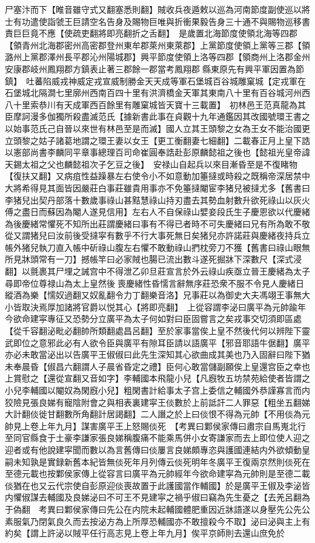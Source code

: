 尸塞汴而下【睢音雖守式又翻塞悉則翻】賊收兵夜遁敕以巡為河南節度副使巡以將士有功遣使詣虢王巨請空名告身及賜物巨唯與折衝果毅告身三十通不與賜物巡移書責巨巨竟不應【使疏吏翻將即亮翻折之舌翻】　是歲置北海節度使領北海等四郡【領青州北海郡密州高密郡登州東牟郡萊州東萊郡】上黨節度使領上黨等三郡【領潞州上黨郡澤州長平郡沁州陽城郡】興平節度使領上洛等四郡【領商州上洛郡金州安康郡岐州鳳翔郡方鎮表止著三郡餘一郡當考鳳翔郡縣東原先有興平軍因置為節鎮】　吐蕃陷威戎神威定戎宣威制勝金天天成等軍石堡城百谷城雕窠城【定戎軍在石堡城北隔澗七里廓州西南百四十里有洪濟橋金天軍其東南八十里有百谷城河州西八十里索恭川有天成軍西百餘里有雕窠城皆天寶十三載置】　初林邑王范真龍為其臣摩訶漫多伽獨所殺盡滅范氏【據新書此事在貞觀十九年通鑑因其改國號環王書之以始事范氏己自晉以來世有林邑至是而滅】國人立其王頭黎之女為王女不能治國更立頭黎之姑子諸葛地謂之環王妻以女王【更工衡翻妻七細翻】二載春正月上皇下誥以憲部尚書李麟同平章事總理百司命崔圓奉誥赴彭原麟懿祖之後也【懿祖光皇帝諱天錫太祖之父也麟懿祖次子乞豆之後】　安禄山自起兵以來目漸昏至是不復睹物【復扶又翻】又病疽性益躁暴左右使令小不如意動加箠撻或時殺之既稱帝深居禁中大將希得見其面皆因嚴莊白事莊雖貴用事亦不免箠撻閹宦李猪兒被撻尤多【舊書曰李猪兒出契丹部落十數歲事祿山甚黠慧祿山持刃盡去其勢血射數升欲死祿山以灰火傅之盡日而蘇因為閹人遂見信用】左右人不自保祿山嬖妾段氏生子慶恩欲以代慶緒為後慶緒常懼死不知所出莊謂慶緒曰事有不得已者時不可失慶緒曰兄有所為敢不敬從又謂猪兒曰汝前後受撻寜有數乎不行大事死無日矣猪兒亦許諾莊與慶緒夜持兵立帳外猪兒執刀直入帳中斫祿山腹左右懼不敢動祿山捫枕旁刀不獲【舊書曰祿山眼無所見牀頭常有一刀】撼帳竿曰必家賊也腸已流出數斗遂死掘牀下深數尺【深式浸翻】以氈裹其尸埋之誡宫中不得泄乙卯旦莊宣言於外云祿山疾亟立晉王慶緒為太子尋即帝位尊禄山為太上皇然後喪慶緒性昏懦言辭無序莊恐衆不服不令見人慶緒日縱酒為樂【懦奴過翻又奴亂翻令力丁翻樂音洛】兄事莊以為御史大夫馮翊王事無大小皆取決焉厚加諸將官爵以悦其心【將即亮翻】　上從容謂李泌曰廣平為元帥踰年今欲命建寜專征又恐勢分立廣平為太子何如對曰臣固嘗言之矣戎事交切須即區處【從千容翻泌毗必翻帥所類翻處昌呂翻】至於家事當俟上皇不然後代何以辨陛下靈武即位之意邪此必有人欲令臣與廣平有隙耳臣請以語廣平【邪音耶語牛倨翻】廣平亦必未敢當泌出以告廣平王俶俶曰此先生深知其心欲曲成其美也乃入固辭曰陛下猶未奉晨昏【俶昌六翻謂人子晨省昏定之禮】臣何心敢當儲副願俟上皇還宫臣之幸也上賞慰之【還從宣翻又音如字】李輔國本飛龍小兒【凡廐牧五坊禁苑給使者皆謂之小兒李輔國以閹奴為閑廐小兒】粗閑書計給事太子宫上委信之輔國外恭謹寡言而内狡險見張良娣有寵陰附會之與相表裏建寜王倓數於上前詆訐二人罪惡【粗坐五翻娣大計翻倓徙甘翻數所角翻計居謁翻】二人譖之於上曰倓恨不得為元帥【不用倓為元帥見上卷上年九月】謀害廣平王上怒賜倓死　【考異曰鄴侯家傳曰肅宗自馬嵬北行至同官縣食于土豪李謙家張良娣稱腹痛不能乘馬併小女寄謙家而去上即位使人迎之迎者或有他說建寜聞而數以為言舊傳曰倓屢言良娣頗專恣與護國連結内外欲傾動皇嗣未知孰是實録新舊本紀皆無倓死年月列傳云倓死明年冬廣平王復兩京然則倓死在至德元載也按鄴侯家傳上從容言曰廣平為元帥經年今欲命建寜為元帥則是至德二載倓猶在也又云代宗使自彭原迎倓喪故置于此護國當作輔國】於是廣平王俶及李泌皆内懼俶謀去輔國及良娣泌曰不可王不見建寜之禍乎俶曰竊為先生憂之【去羌呂翻為于偽翻　考異曰鄴侯家傳曰先公在内院未起輔國體肥重因近牀語遂以身壓先公先公素服氣乃閉氣良久而去按泌方為上所厚恐輔國亦不敢擅殺今不取】泌曰泌與主上有約矣【謂上許泌以賊平任行高志見上卷上年九月】俟平京師則去還山庶免於